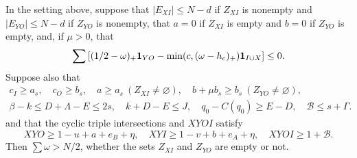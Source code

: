 \begin{lemma}
\label{short392:incidence-table}
In the setting above, suppose that $|E_{XI}|\le N-d$ if $Z_{XI}$ is nonempty and $|E_{YO}|\le N-d$
if $Z_{YO}$ is nonempty, that $a=0$ if $Z_{XI}$ is empty and $b=0$ if $Z_{YO}$ is empty, and, if $\mu>0$, that
\[
 \sum\left[(1/2-\omega)_+\mathbf 1_{YO}
       -\min(c,(\omega-h_c)_+)\mathbf 1_{I\cup X}\right]\le0.
\]
Suppose also that
\[
\begin{gathered}
 c_I\ge a_s,\quad c_O\ge b_s,\quad
 a\ge a_s\ (Z_{XI}\ne\varnothing),\quad
 b+\mu b_s\ge b_s\ (Z_{YO}\ne\varnothing),\\
 \beta-k\le D+\Lambda-E\le2s,\quad k+D-E\le J,\quad
 q_0-C(q_0)\ge E-D,\quad \mathcal B\le s+\Gamma.
\end{gathered}
\]
and that the cyclic triple intersections and $XYOI$ satisfy
\[
 XYO\ge1-u+a+e_B+\eta,\quad
 XYI\ge1-v+b+e_A+\eta,\quad XYOI\ge1+\mathcal B.
\]
Then $\sum\omega>N/2$, whether the sets $Z_{XI}$ and $Z_{YO}$ are empty or not.
\end{lemma}
